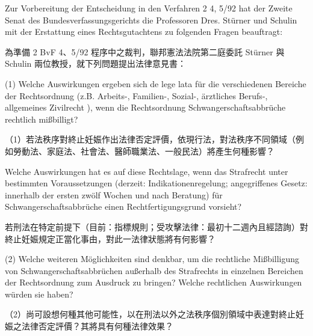 \documentclass[12pt]{article}
\begin{document}
\begin{sourcepara}[title={原文C.31}]
Zur Vorbereitung der Entscheidung in den Verfahren 2 \abbrBvF{} 4, 5/92 hat der Zweite Senat des Bundesverfassungsgerichts die Professoren Dres. Stürner und Schulin mit der Erstattung eines Rechtsgutachtens zu folgenden Fragen beauftragt:
\end{sourcepara}
\begin{transpara}
為準備 2 BvF 4、5/92 程序中之裁判，聯邦憲法法院第二庭委託 Stürner 與 Schulin 兩位教授，就下列問題提出法律意見書：
\end{transpara}

\begin{sourcepara}[title={原文C.32}]
(1) Welche Auswirkungen ergeben sich de lege lata für die verschiedenen Bereiche der Rechtsordnung (z.B. Arbeits-, Familien-, Sozial-, ärztliches Berufs-, allgemeines Zivilrecht ), wenn die Rechtsordnung Schwangerschaftsabbrüche rechtlich mißbilligt?
\end{sourcepara}
\begin{transpara}
（1）若法秩序對終止妊娠作出法律否定評價，依現行法，對法秩序不同領域（例如勞動法、家庭法、社會法、醫師職業法、一般民法）將產生何種影響？
\end{transpara}

\begin{sourcepara}[title={原文C.33}]
Welche Auswirkungen hat es auf diese Rechtslage, wenn das Strafrecht unter bestimmten Voraussetzungen (derzeit: Indikationenregelung; angegriffenes Gesetz: innerhalb der ersten zwölf Wochen und nach Beratung) für Schwangerschaftsabbrüche einen Rechtfertigungsgrund vorsieht?
\end{sourcepara}
\begin{transpara}
若刑法在特定前提下（目前：指標規則；受攻擊法律：最初十二週內且經諮詢）對終止妊娠規定正當化事由，對此一法律狀態將有何影響？
\end{transpara}

\begin{sourcepara}[title={原文C.34}]
(2) Welche weiteren Möglichkeiten sind denkbar, um die rechtliche Mißbilligung von Schwangerschaftsabbrüchen außerhalb des Strafrechts in einzelnen Bereichen der Rechtsordnung zum Ausdruck zu bringen? Welche rechtlichen Auswirkungen würden sie haben?
\end{sourcepara}
\begin{transpara}
（2）尚可設想何種其他可能性，以在刑法以外之法秩序個別領域中表達對終止妊娠之法律否定評價？其將具有何種法律效果？
\end{transpara}
\end{document}
